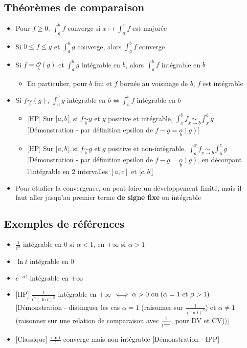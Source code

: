 \documentclass[openany]{book}
\begin{document}
\subsection{Théorèmes de comparaison}

\begin{itemize}
    \item Pour $f \geq 0$, $\int_{a}^{b}f$ converge si $x \mapsto \int_{a}^{x}f$ est majorée
    \item Si $0 \leq f \leq g$ et $\int_{a}^{b}g$ converge, alors $\int_{a}^{b}f$ converge
    \item Si $f =\! \underset{b}{\mathcal{O}} (g)$ et $\int_{a}^{b}g$ intégrable en $b$, alors $\int_{a}^{b}f$ intégrable en  $b$
    \begin{itemize}
        \item En particulier, pour $b$ fini et $f$ bornée au voisinage de $b$, $f$ est intégrable
    \end{itemize}
    \item Si $f \underset{b}{\sim} (g)$, $\int_{a}^{b}g$ intégrable en $b \iff \int_{a}^{b}f$ intégrable en  $b$
    \begin{itemize}
        \item{} [HP] Sur $[a, b[$, si $f \underset{b}{\sim} g$ et $g$ positive et intégrable, $\int_{x}^{b} f \underset{x \rightarrow b}{\sim} \int_{x}^{b} g$ [Démonstration - par définition epsilon de $f-g =\underset{b}{o} (g)$]
        \item{} [HP] Sur $[a, b[$, si $f \underset{b}{\sim} g$ et $g$ positive et non-intégrable, $\int_{a}^{x} f \underset{x \rightarrow b}{\sim} \int_{a}^{x} g$ [Démonstration - par définition epsilon de $f-g =\underset{b}{o} (g)$, en découpant l'intégrable en 2 intervalles $[a, c]$ et $[c, b[$]
    \end{itemize}
    \item Pour étudier la convergence, on peut faire un développement limité, mais il faut aller jusqu'au premier terme \textbf{de signe fixe} ou intégrable
\end{itemize}

\subsection{Exemples de références}

\begin{itemize}
    \item $\frac{1}{t^\alpha}$ intégrable en $0$ si $\alpha < 1$, en $+\infty$ si $\alpha > 1$
    \item $\ln t$ intégrable en $0$
    \item $e^{-\alpha t}$ intégrable en $+\infty$
    \item{} [HP] $\frac{1}{t^\alpha (\ln t)^\beta}$ intégrable en $+\infty$ $\iff \alpha > 0 \text{ ou } (\alpha = 1 \text{ et } \beta > 1)$ [Démonstration - distinguer les cas $\alpha = 1$ (raisonner sur $\frac{1}{(\ln t)^\beta}$) et $\alpha \neq 1$ (raisonner sur une relation de comparaison avec $\frac{1}{t^{\frac{\alpha + 1}{2}}}$, pour DV et CV))]
    \item{} [Classique] $\frac{\sin t}{t}$ converge mais non-intégrable [Démonstration - IPP]
\end{itemize}
\end{document}
